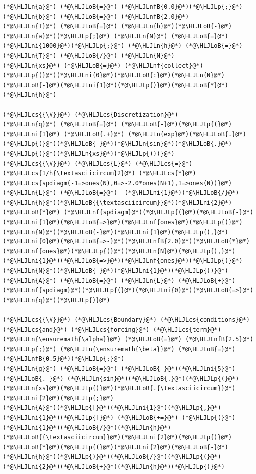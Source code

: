\documentclass[12pt,a4paper]{article}
\newcommand{\HLJLn}[1]{#1}
\newcommand{\HLJLnf}[1]{\textcolor[RGB]{66,102,213}{#1}}
\newcommand{\HLJLnfB}[1]{\textcolor[RGB]{59,151,46}{#1}}
\newcommand{\HLJLni}[1]{\textcolor[RGB]{59,151,46}{#1}}
\newcommand{\HLJLoB}[1]{\textcolor[RGB]{102,102,102}{\textbf{#1}}}
\newcommand{\HLJLp}[1]{#1}
\newcommand{\HLJLcs}[1]{\textcolor[RGB]{153,153,119}{\textit{#1}}}
\begin{document}
\begin{lstlisting}
(*@\HLJLn{a}@*) (*@\HLJLoB{=}@*) (*@\HLJLnfB{0.0}@*)(*@\HLJLp{;}@*) (*@\HLJLn{b}@*) (*@\HLJLoB{=}@*) (*@\HLJLnfB{2.0}@*)
(*@\HLJLn{T}@*) (*@\HLJLoB{=}@*) (*@\HLJLn{b}@*)(*@\HLJLoB{-}@*)(*@\HLJLn{a}@*)(*@\HLJLp{;}@*) (*@\HLJLn{N}@*) (*@\HLJLoB{=}@*) (*@\HLJLni{1000}@*)(*@\HLJLp{;}@*) (*@\HLJLn{h}@*) (*@\HLJLoB{=}@*) (*@\HLJLn{T}@*) (*@\HLJLoB{/}@*) (*@\HLJLn{N}@*)
(*@\HLJLn{xs}@*) (*@\HLJLoB{=}@*) (*@\HLJLnf{collect}@*)(*@\HLJLp{(}@*)(*@\HLJLni{0}@*)(*@\HLJLoB{:}@*)(*@\HLJLn{N}@*)(*@\HLJLoB{-}@*)(*@\HLJLni{1}@*)(*@\HLJLp{)}@*)(*@\HLJLoB{*}@*)(*@\HLJLn{h}@*)

(*@\HLJLcs{{\#}}@*) (*@\HLJLcs{Discretization}@*)
(*@\HLJLn{q}@*) (*@\HLJLoB{=}@*) (*@\HLJLoB{-}@*)(*@\HLJLp{(}@*)(*@\HLJLni{1}@*) (*@\HLJLoB{.+}@*) (*@\HLJLn{exp}@*)(*@\HLJLoB{.}@*)(*@\HLJLp{(}@*)(*@\HLJLoB{-}@*)(*@\HLJLn{sin}@*)(*@\HLJLoB{.}@*)(*@\HLJLp{(}@*)(*@\HLJLn{xs}@*)(*@\HLJLp{)))}@*)
(*@\HLJLcs{{\#}}@*) (*@\HLJLcs{L}@*) (*@\HLJLcs{=}@*)  (*@\HLJLcs{1/h{\textasciicircum}2}@*) (*@\HLJLcs{*}@*) (*@\HLJLcs{spdiagm(-1=>ones(N),0=>-2.0*ones(N+1),1=>ones(N))}@*)
(*@\HLJLn{L}@*) (*@\HLJLoB{=}@*)  (*@\HLJLni{1}@*)(*@\HLJLoB{/}@*)(*@\HLJLn{h}@*)(*@\HLJLoB{{\textasciicircum}}@*)(*@\HLJLni{2}@*) (*@\HLJLoB{*}@*) (*@\HLJLnf{spdiagm}@*)(*@\HLJLp{(}@*)(*@\HLJLoB{-}@*)(*@\HLJLni{1}@*)(*@\HLJLoB{=>}@*)(*@\HLJLnf{ones}@*)(*@\HLJLp{(}@*)(*@\HLJLn{N}@*)(*@\HLJLoB{-}@*)(*@\HLJLni{1}@*)(*@\HLJLp{),}@*)(*@\HLJLni{0}@*)(*@\HLJLoB{=>-}@*)(*@\HLJLnfB{2.0}@*)(*@\HLJLoB{*}@*)(*@\HLJLnf{ones}@*)(*@\HLJLp{(}@*)(*@\HLJLn{N}@*)(*@\HLJLp{),}@*)(*@\HLJLni{1}@*)(*@\HLJLoB{=>}@*)(*@\HLJLnf{ones}@*)(*@\HLJLp{(}@*)(*@\HLJLn{N}@*)(*@\HLJLoB{-}@*)(*@\HLJLni{1}@*)(*@\HLJLp{))}@*)
(*@\HLJLn{A}@*) (*@\HLJLoB{=}@*) (*@\HLJLn{L}@*) (*@\HLJLoB{+}@*) (*@\HLJLnf{spdiagm}@*)(*@\HLJLp{(}@*)(*@\HLJLni{0}@*)(*@\HLJLoB{=>}@*)(*@\HLJLn{q}@*)(*@\HLJLp{)}@*)

(*@\HLJLcs{{\#}}@*) (*@\HLJLcs{Boundary}@*) (*@\HLJLcs{conditions}@*) (*@\HLJLcs{and}@*) (*@\HLJLcs{forcing}@*) (*@\HLJLcs{term}@*) 
(*@\HLJLn{\ensuremath{\alpha}}@*) (*@\HLJLoB{=}@*) (*@\HLJLnfB{2.5}@*)(*@\HLJLp{;}@*) (*@\HLJLn{\ensuremath{\beta}}@*) (*@\HLJLoB{=}@*) (*@\HLJLnfB{0.5}@*)(*@\HLJLp{;}@*)
(*@\HLJLn{g}@*) (*@\HLJLoB{=}@*) (*@\HLJLoB{-}@*)(*@\HLJLni{5}@*) (*@\HLJLoB{.-}@*) (*@\HLJLn{sin}@*)(*@\HLJLoB{.}@*)(*@\HLJLp{(}@*)(*@\HLJLn{xs}@*)(*@\HLJLp{)}@*)(*@\HLJLoB{.{\textasciicircum}}@*)(*@\HLJLni{2}@*)(*@\HLJLp{;}@*)
(*@\HLJLn{A}@*)(*@\HLJLp{[}@*)(*@\HLJLni{1}@*)(*@\HLJLp{,}@*)(*@\HLJLni{1}@*)(*@\HLJLp{]}@*) (*@\HLJLoB{+=}@*) (*@\HLJLp{(}@*)(*@\HLJLni{1}@*)(*@\HLJLoB{/}@*)(*@\HLJLn{h}@*)(*@\HLJLoB{{\textasciicircum}}@*)(*@\HLJLni{2}@*)(*@\HLJLp{)}@*)(*@\HLJLoB{*}@*)(*@\HLJLp{(}@*)(*@\HLJLni{2}@*)(*@\HLJLoB{-}@*)(*@\HLJLn{h}@*)(*@\HLJLp{)}@*)(*@\HLJLoB{/}@*)(*@\HLJLp{(}@*)(*@\HLJLni{2}@*)(*@\HLJLoB{+}@*)(*@\HLJLn{h}@*)(*@\HLJLp{)}@*)


\end{lstlisting}
\end{document}
